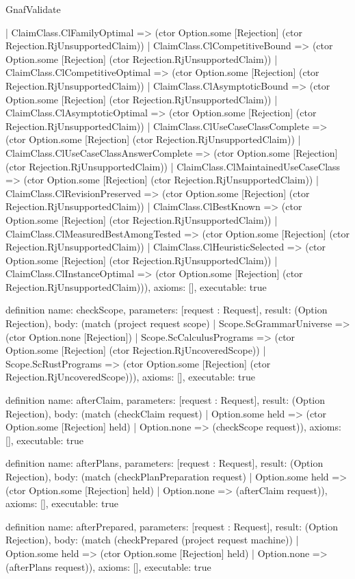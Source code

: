 \begin{lexlean}{GnafValidate}
\begin{semanticmodule}
{    | ClaimClass.ClFamilyOptimal => (ctor Option.some [Rejection] (ctor Rejection.RjUnsupportedClaim))
    | ClaimClass.ClCompetitiveBound => (ctor Option.some [Rejection] (ctor Rejection.RjUnsupportedClaim))
    | ClaimClass.ClCompetitiveOptimal => (ctor Option.some [Rejection] (ctor Rejection.RjUnsupportedClaim))
    | ClaimClass.ClAsymptoticBound => (ctor Option.some [Rejection] (ctor Rejection.RjUnsupportedClaim))
    | ClaimClass.ClAsymptoticOptimal => (ctor Option.some [Rejection] (ctor Rejection.RjUnsupportedClaim))
    | ClaimClass.ClUseCaseClassComplete => (ctor Option.some [Rejection] (ctor Rejection.RjUnsupportedClaim))
    | ClaimClass.ClUseCaseClassAnswerComplete => (ctor Option.some [Rejection] (ctor Rejection.RjUnsupportedClaim))
    | ClaimClass.ClMaintainedUseCaseClass => (ctor Option.some [Rejection] (ctor Rejection.RjUnsupportedClaim))
    | ClaimClass.ClRevisionPreserved => (ctor Option.some [Rejection] (ctor Rejection.RjUnsupportedClaim))
    | ClaimClass.ClBestKnown => (ctor Option.some [Rejection] (ctor Rejection.RjUnsupportedClaim))
    | ClaimClass.ClMeasuredBestAmongTested => (ctor Option.some [Rejection] (ctor Rejection.RjUnsupportedClaim))
    | ClaimClass.ClHeuristicSelected => (ctor Option.some [Rejection] (ctor Rejection.RjUnsupportedClaim))
    | ClaimClass.ClInstanceOptimal => (ctor Option.some [Rejection] (ctor Rejection.RjUnsupportedClaim))),
  axioms: [],
  executable: true
}

definition{
  name: checkScope,
  parameters: [request : Request],
  result: (Option Rejection),
  body: (match (project request scope)
    | Scope.ScGrammarUniverse => (ctor Option.none [Rejection])
    | Scope.ScCalculusPrograms => (ctor Option.some [Rejection] (ctor Rejection.RjUncoveredScope))
    | Scope.ScRustPrograms => (ctor Option.some [Rejection] (ctor Rejection.RjUncoveredScope))),
  axioms: [],
  executable: true
}

definition{
  name: afterClaim,
  parameters: [request : Request],
  result: (Option Rejection),
  body: (match (checkClaim request)
    | Option.some held => (ctor Option.some [Rejection] held)
    | Option.none => (checkScope request)),
  axioms: [],
  executable: true
}

definition{
  name: afterPlans,
  parameters: [request : Request],
  result: (Option Rejection),
  body: (match (checkPlanPreparation request)
    | Option.some held => (ctor Option.some [Rejection] held)
    | Option.none => (afterClaim request)),
  axioms: [],
  executable: true
}

definition{
  name: afterPrepared,
  parameters: [request : Request],
  result: (Option Rejection),
  body: (match (checkPrepared (project request machine))
    | Option.some held => (ctor Option.some [Rejection] held)
    | Option.none => (afterPlans request)),
  axioms: [],
  executable: true
}


\end{semanticmodule}
\end{lexlean}
